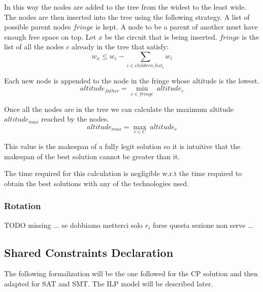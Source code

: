        In this way the nodes are added to the tree from the widest to the least wide.
        The nodes are then inserted into the tree using the following strategy. A list of possible parent nodes $fringe$ is kept. 
        A node to be a parent of another must have enough free space on top. Let $x$ be the circuit that 
        is being inserted. $fringe$ is the list of all the nodes $c$ already in the tree that satisfy: 
        \begin{equation}
            w_x \leq w_c - \sum_{i \in children\_list_c} w_i
        \end{equation}
        
        Each new node is appended to the node in the fringe whose altitude is the lowest.
        \begin{equation}
            altitude_{father} = \min_{c \in fringe}\ {altitude_c} 
        \end{equation}

        Once all the nodes are in the tree we can calculate the maximum altitude $altitude_{max}$ reached by the nodes.
        \begin{equation}
            altitude_{max} = \max_{c \in C}\  altitude_c
        \end{equation}

        This value is the makespan of a fully legit solution so it is intuitive that the makespan of the best solution cannot
        be greater than it. 
        
        The time required for this calculation is negligible w.r.t the time required to obtain the best solutions with any 
        of the technologies used.

    \subsubsection{Rotation}
        \colorbox{BurntOrange}{TODO missing ... se dobbiamo metterci solo $r_i$ forse questa sezione non serve ...}



\subsection{Shared Constraints Declaration} \label{sec:shared_constraints}
    The following formalization will be the one followed for the CP solution and then adapted for
    SAT and SMT. The ILP model will be described later. \\

